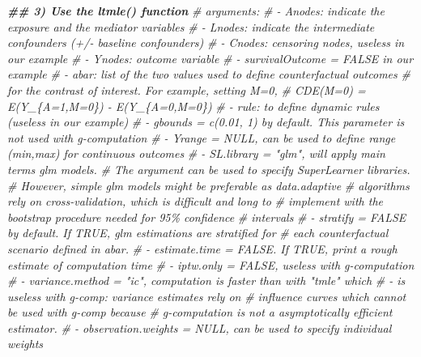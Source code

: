 \documentclass[
]{book}
\newenvironment{Shaded}{\begin{snugshade}}{\end{snugshade}}
\newcommand{\CommentTok}[1]{\textcolor[rgb]{0.56,0.35,0.01}{\textit{#1}}}
\newcommand{\DocumentationTok}[1]{\textcolor[rgb]{0.56,0.35,0.01}{\textbf{\textit{#1}}}}
\begin{document}
\begin{Shaded}
\begin{Highlighting}[]
\DocumentationTok{\#\# 3) Use the ltmle() function}
\CommentTok{\# arguments:}
\CommentTok{\#  {-} Anodes: indicate the exposure and the mediator variables}
\CommentTok{\#  {-} Lnodes: indicate the intermediate confounders (+/{-} baseline confounders)}
\CommentTok{\#  {-} Cnodes: censoring nodes, useless in our example}
\CommentTok{\#  {-} Ynodes: outcome variable}
\CommentTok{\#  {-} survivalOutcome = FALSE in our example}
\CommentTok{\#  {-} abar: list of the two values used to define counterfactual outcomes}
\CommentTok{\#          for the contrast of interest. For example, setting M=0,}
\CommentTok{\#          CDE(M=0) = E(Y\_\{A=1,M=0\}) {-} E(Y\_\{A=0,M=0\})}
\CommentTok{\#  {-} rule: to define dynamic rules (useless in our example)}
\CommentTok{\#  {-} gbounds = c(0.01, 1) by default. This parameter is not used with g{-}computation}
\CommentTok{\#  {-} Yrange = NULL, can be used to define range (min,max) for continuous outcomes}
\CommentTok{\#  {-} SL.library = "glm",  will apply main terms glm models.}
\CommentTok{\#                 The argument can be used to specify SuperLearner libraries.}
\CommentTok{\#                 However, simple glm models might be preferable as data.adaptive}
\CommentTok{\#                 algorithms rely on cross{-}validation, which is difficult and long to}
\CommentTok{\#                 implement with the bootstrap procedure needed for 95\% confidence}
\CommentTok{\#                 intervals}
\CommentTok{\#  {-} stratify = FALSE by default. If TRUE, glm estimations are stratified for}
\CommentTok{\#               each counterfactual scenario defined in abar.}
\CommentTok{\#  {-} estimate.time = FALSE. If TRUE, print a rough estimate of computation time}
\CommentTok{\#  {-} iptw.only = FALSE, useless with g{-}computation}
\CommentTok{\#  {-} variance.method = "ic", computation is faster than with "tmle" which}
\CommentTok{\#  {-}                     is useless with g{-}comp: variance estimates rely on}
\CommentTok{\#                        influence curves which cannot be used with g{-}comp because}
\CommentTok{\#                       g{-}computation is not a asymptotically efficient estimator.}
\CommentTok{\#  {-} observation.weights = NULL, can be used to specify individual weights}


\end{Highlighting}
\end{Shaded}
\end{document}
